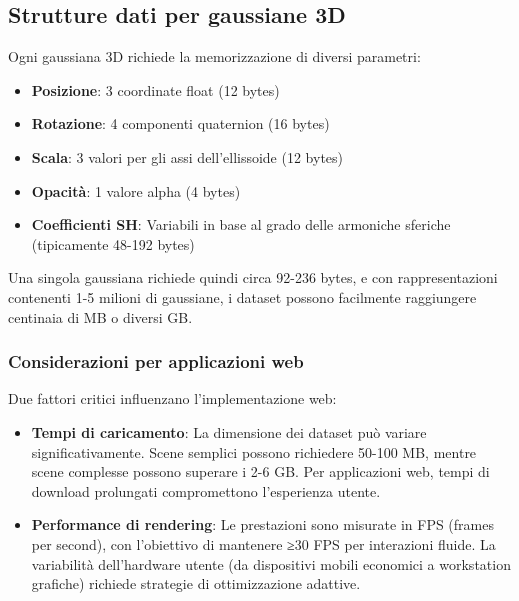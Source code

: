\subsection{Strutture dati per gaussiane 3D}

Ogni gaussiana 3D richiede la memorizzazione di diversi parametri:
\begin{itemize}
    \item \textbf{Posizione}: 3 coordinate float (12 bytes)
    \item \textbf{Rotazione}: 4 componenti quaternion (16 bytes)
    \item \textbf{Scala}: 3 valori per gli assi dell'ellissoide (12 bytes)
    \item \textbf{Opacità}: 1 valore alpha (4 bytes)
    \item \textbf{Coefficienti SH}: Variabili in base al grado delle armoniche sferiche (tipicamente 48-192 bytes)
\end{itemize}

Una singola gaussiana richiede quindi circa 92-236 bytes, e con rappresentazioni contenenti 1-5 milioni di gaussiane, i dataset possono facilmente raggiungere centinaia di MB o diversi GB.

\subsubsection{Considerazioni per applicazioni web}

Due fattori critici influenzano l'implementazione web:

\begin{itemize}
\item \textbf{Tempi di caricamento}: La dimensione dei dataset può variare significativamente. Scene semplici possono richiedere 50-100 MB, mentre scene complesse possono superare i 2-6 GB. Per applicazioni web, tempi di download prolungati compromettono l'esperienza utente.

\item \textbf{Performance di rendering}: Le prestazioni sono misurate in FPS (frames per second), con l'obiettivo di mantenere ≥30 FPS per interazioni fluide. La variabilità dell'hardware utente (da dispositivi mobili economici a workstation grafiche) richiede strategie di ottimizzazione adattive.
\end{itemize}
